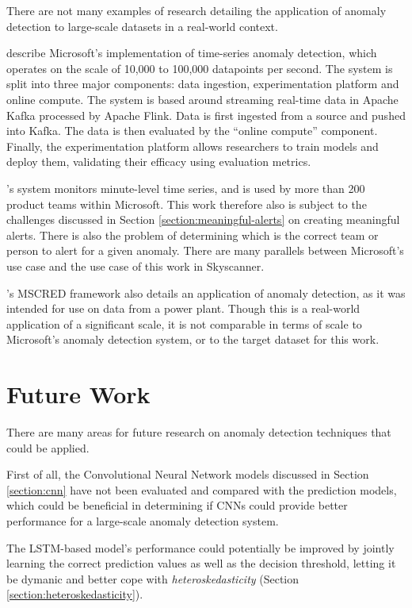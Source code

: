 \documentclass{mpaper}
\begin{document}
There are not many examples of research detailing the application of anomaly detection to large-scale datasets in a real-world context.

\cite{MicrosoftTimeSeries} describe Microsoft's implementation of time-series anomaly detection, which operates on the scale of 10,000 to 100,000 datapoints per second. The system is split into three major components: data ingestion, experimentation platform and online compute. The system is based around streaming real-time data in Apache Kafka processed by Apache Flink. Data is first ingested from a source and pushed into Kafka. The data is then evaluated by the ``online compute'' component. Finally, the experimentation platform allows researchers to train models and deploy them, validating their efficacy using evaluation metrics.

\cite{MicrosoftTimeSeries}'s system monitors minute-level time series, and is used by more than 200 product teams within Microsoft. This work therefore also is subject to the challenges discussed in Section \ref{section:meaningful-alerts} on creating meaningful alerts. There is also the problem of determining which is the correct team or person to alert for a given anomaly. There are many parallels between Microsoft's use case and the use case of this work in Skyscanner.

\cite{deepMultivariateNetwork}'s MSCRED framework also details an application of anomaly detection, as it was intended for use on data from a power plant. Though this is a real-world application of a significant scale, it is not comparable in terms of scale to Microsoft's anomaly detection system, or to the target dataset for this work.

\section{Future Work}

There are many areas for future research on anomaly detection techniques that could be applied.

First of all, the Convolutional Neural Network models discussed in Section \ref{section:cnn} have not been evaluated and compared with the prediction models, which could be beneficial in determining if CNNs could provide better performance for a large-scale anomaly detection system.

The LSTM-based model's performance could potentially be improved by jointly learning the correct prediction values as well as the decision threshold, letting it be dymanic and better cope with \textit{heteroskedasticity} (Section \ref{section:heteroskedasticity}).
\end{document}
